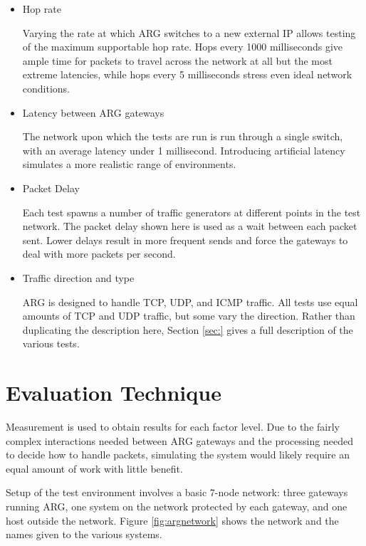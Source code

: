 \begin{itemize}
\item Hop rate
	\par Varying the rate at which \ac{ARG} switches to a new external \ac{IP} allows testing of the maximum supportable hop rate. Hops every 1000 milliseconds give ample time for packets to travel across the network at all but the most extreme latencies, while hops every 5 milliseconds stress even ideal network conditions.

\item Latency between \ac{ARG} gateways
	\par The network upon which the tests are run is run through a single switch, with an average latency under 1 millisecond. Introducing artificial latency simulates a more realistic range of environments.

\item Packet Delay
	\par Each test spawns a number of traffic generators at different points in the test network. The packet delay shown here is used as a wait between each packet sent. Lower delays result in more frequent sends and force the gateways to deal with more packets per second.

\item Traffic direction and type
	\par \ac{ARG} is designed to handle \ac{TCP}, \ac{UDP}, and \ac{ICMP} traffic. All tests use equal amounts of \ac{TCP} and \ac{UDP} traffic, but some vary the direction. Rather than duplicating the description here, Section \ref{sec:} gives a full description of the various tests.
\end{itemize}

\section{Evaluation Technique}
\label{sec:eval_technique}
\par Measurement is used to obtain results for each factor level. Due to the fairly complex interactions needed between \ac{ARG} gateways and the processing needed to decide how to handle packets, simulating the system would likely require an equal amount of work with little benefit.

\par Setup of the test environment involves a basic 7-node network: three gateways running \ac{ARG}, one system on the network protected by each gateway, and one host outside the network. Figure \ref{fig:argnetwork} shows the network and the names given to the various systems.

